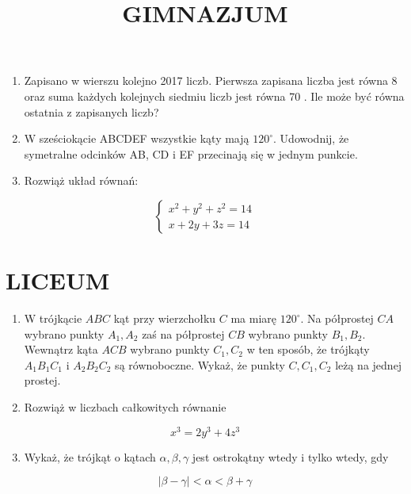 \documentclass[10pt]{article}
\title{GIMNAZJUM }
\author{}
\date{}
\begin{document}
\maketitle
\begin{enumerate}
  \item Zapisano w wierszu kolejno 2017 liczb. Pierwsza zapisana liczba jest równa 8 oraz suma każdych kolejnych siedmiu liczb jest równa 70 . Ile może być równa ostatnia z zapisanych liczb?
  \item W sześciokącie ABCDEF wszystkie kąty mają \(120^{\circ}\). Udowodnij, że symetralne odcinków AB, CD i EF przecinają się w jednym punkcie.
  \item Rozwiąż układ równań:
\end{enumerate}

\[
\left\{\begin{array}{c}
x^{2}+y^{2}+z^{2}=14 \\
x+2 y+3 z=14
\end{array}\right.
\]

\section*{LICEUM}
\begin{enumerate}
  \item W trójkącie \(A B C\) kąt przy wierzchołku \(C\) ma miarę \(120^{\circ}\). Na półprostej \(C A\) wybrano punkty \(A_{1}, A_{2}\) zaś na półprostej \(C B\) wybrano punkty \(B_{1}, B_{2}\). Wewnątrz kąta \(A C B\) wybrano punkty \(C_{1}, C_{2}\) w ten sposób, że trójkąty \(A_{1} B_{1} C_{1}\) i \(A_{2} B_{2} C_{2}\) są równoboczne. Wykaż, że punkty \(C, C_{1}, C_{2}\) leżą na jednej prostej.
  \item Rozwiąż w liczbach całkowitych równanie
\end{enumerate}

\[
x^{3}=2 y^{3}+4 z^{3}
\]

\begin{enumerate}
  \setcounter{enumi}{2}
  \item Wykaż, że trójkąt o kątach \(\alpha, \beta, \gamma\) jest ostrokątny wtedy i tylko wtedy, gdy
\end{enumerate}

\[
|\beta-\gamma|<\alpha<\beta+\gamma
\]
\end{document}
